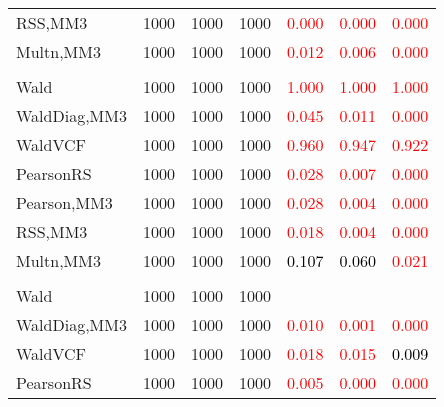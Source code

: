 \documentclass[
]{article}
\begin{document}
\begin{table}[H]
{\begin{tabular}[t]{lrrrrrr}
\hspace{1em}RSS,MM3 & 1000 & 1000 & 1000 & \textcolor{red}{0.000} & \textcolor{red}{0.000} & \vphantom{1} \textcolor{red}{0.000}\\
\hspace{1em}Multn,MM3 & 1000 & 1000 & 1000 & \textcolor{red}{0.012} & \textcolor{red}{0.006} & \textcolor{red}{0.000}\\
\addlinespace[0.3em]
\multicolumn{7}{l}{\textbf{2F 10V}}\\
\hspace{1em}Wald & 1000 & 1000 & 1000 & \textcolor{red}{1.000} & \textcolor{red}{1.000} & \textcolor{red}{1.000}\\
\hspace{1em}WaldDiag,MM3 & 1000 & 1000 & 1000 & \textcolor{red}{0.045} & \textcolor{red}{0.011} & \textcolor{red}{0.000}\\
\hspace{1em}WaldVCF & 1000 & 1000 & 1000 & \textcolor{red}{0.960} & \textcolor{red}{0.947} & \textcolor{red}{0.922}\\
\hspace{1em}PearsonRS & 1000 & 1000 & 1000 & \textcolor{red}{0.028} & \textcolor{red}{0.007} & \textcolor{red}{0.000}\\
\hspace{1em}Pearson,MM3 & 1000 & 1000 & 1000 & \textcolor{red}{0.028} & \textcolor{red}{0.004} & \textcolor{red}{0.000}\\
\hspace{1em}RSS,MM3 & 1000 & 1000 & 1000 & \textcolor{red}{0.018} & \textcolor{red}{0.004} & \textcolor{red}{0.000}\\
\hspace{1em}Multn,MM3 & 1000 & 1000 & 1000 & \textcolor{black}{0.107} & \textcolor{black}{0.060} & \textcolor{red}{0.021}\\
\addlinespace[0.3em]
\multicolumn{7}{l}{\textbf{3F 15V}}\\
\hspace{1em}Wald & 1000 & 1000 & 1000 & \textcolor{black}{} & \textcolor{black}{} & \textcolor{black}{}\\
\hspace{1em}WaldDiag,MM3 & 1000 & 1000 & 1000 & \textcolor{red}{0.010} & \textcolor{red}{0.001} & \textcolor{red}{0.000}\\
\hspace{1em}WaldVCF & 1000 & 1000 & 1000 & \textcolor{red}{0.018} & \textcolor{red}{0.015} & \textcolor{black}{0.009}\\
\hspace{1em}PearsonRS & 1000 & 1000 & 1000 & \textcolor{red}{0.005} & \textcolor{red}{0.000} & \textcolor{red}{0.000}\\

\end{tabular}}
\end{table}
\end{document}
